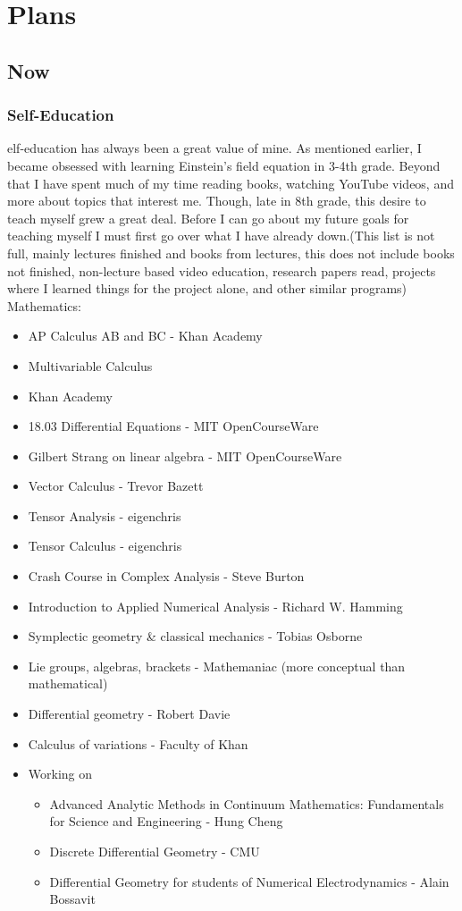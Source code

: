 \chapter{Plans}
\section{Now}
\subsection{Self-Education}
elf-education has always been a great value of mine. As mentioned earlier, I became obsessed with learning Einstein's field equation in 3-4th grade. Beyond that I have spent much of my time reading books, watching YouTube videos, and more about topics that interest me. Though, late in 8th grade, this desire to teach myself grew a great deal. Before I can go about my future goals for teaching myself I must first go over what I have already down.(This list is not full, mainly lectures finished and books from lectures, this does not include books not finished, non-lecture based video education, research papers read, projects where I learned things for the project alone, and other similar programs)
\\
Mathematics:
\begin{itemize}
    \item AP Calculus AB and BC - Khan Academy
    \item Multivariable Calculus 
    \item Khan Academy
    \item 18.03 Differential Equations - MIT OpenCourseWare
    \item Gilbert Strang on linear algebra - MIT OpenCourseWare
    \item Vector Calculus - Trevor Bazett
    \item Tensor Analysis - eigenchris
    \item Tensor Calculus - eigenchris
    \item Crash Course in Complex Analysis - Steve Burton 
    \item Introduction to Applied Numerical Analysis - Richard W. Hamming
    \item Symplectic geometry \& classical mechanics - Tobias Osborne 
    \item Lie groups, algebras, brackets - Mathemaniac (more conceptual than mathematical)
    \item Differential geometry - Robert Davie
    \item Calculus of variations - Faculty of Khan
    \item Working on
    \begin{itemize}
        \item Advanced Analytic Methods in Continuum Mathematics: Fundamentals for Science and Engineering - Hung Cheng 
        \item Discrete Differential Geometry - CMU
        \item Differential Geometry for students of Numerical Electrodynamics - Alain Bossavit
    \end{itemize}

\end{itemize}
